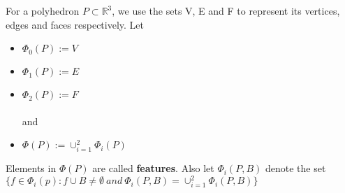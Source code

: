 \documentclass[twoside]{article}
\begin{document}
\begin{multicols}{2}
For a polyhedron $P \subset \mathbb{R}^3$, we use the sets V, E and F to represent its vertices, edges and faces respectively. Let

\begin{itemize}
	\item $\Phi_0(P):=V$
	\item $\Phi_1(P):=E$
	\item $\Phi_2(P):=F$
	\\
	\\ and
	\item $\Phi(P):=\displaystyle\mathop{\cup}_{i=1}^2\Phi_i(P)$
\end{itemize}

Elements in $\Phi(P)$ are called \textbf{features}. Also let $\Phi_i(P,B)$ denote the set $\{f\in\Phi_i(p): f\cup B\neq \emptyset\ and\ \Phi_i(P,B)=\displaystyle\mathop{\cup}_{i=1}^2\Phi_i(P,B)\}$



\end{multicols}
\end{document}
